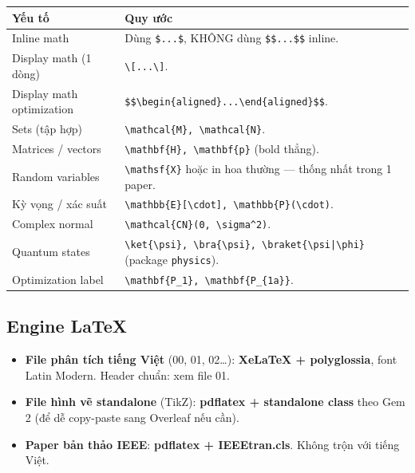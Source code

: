 \documentclass[11pt,a4paper]{article}
\begin{document}
\begin{longtable}{@{}p{5cm} p{10cm}@{}}
\toprule
\textbf{Yếu tố} & \textbf{Quy ước} \\
\midrule
\endhead
Inline math & Dùng \texttt{\$...\$}, KHÔNG dùng \texttt{\$\$...\$\$} inline. \\
Display math (1 dòng) & \texttt{\textbackslash[...\textbackslash]}. \\
Display math optimization & \texttt{\$\$\textbackslash begin\{aligned\}...\textbackslash end\{aligned\}\$\$}. \\
Sets (tập hợp) & \texttt{\textbackslash mathcal\{M\}, \textbackslash mathcal\{N\}}. \\
Matrices / vectors & \texttt{\textbackslash mathbf\{H\}, \textbackslash mathbf\{p\}} (bold thẳng). \\
Random variables & \texttt{\textbackslash mathsf\{X\}} hoặc in hoa thường --- thống nhất trong 1 paper. \\
Kỳ vọng / xác suất & \texttt{\textbackslash mathbb\{E\}[\textbackslash cdot], \textbackslash mathbb\{P\}(\textbackslash cdot)}. \\
Complex normal & \texttt{\textbackslash mathcal\{CN\}(0, \textbackslash sigma\textasciicircum 2)}. \\
Quantum states & \texttt{\textbackslash ket\{\textbackslash psi\}, \textbackslash bra\{\textbackslash psi\}, \textbackslash braket\{\textbackslash psi|\textbackslash phi\}} (package \texttt{physics}). \\
Optimization label & \texttt{\textbackslash mathbf\{P\_1\}, \textbackslash mathbf\{P\_\{1a\}\}}. \\
\bottomrule
\end{longtable}

\subsection{Engine LaTeX}

\begin{itemize}
  \item \textbf{File phân tích tiếng Việt} (00, 01, 02\dots): \textbf{XeLaTeX + polyglossia}, font Latin Modern. Header chuẩn: xem file 01.
  \item \textbf{File hình vẽ standalone} (TikZ): \textbf{pdflatex + standalone class} theo Gem 2 (để dễ copy-paste sang Overleaf nếu cần).
  \item \textbf{Paper bản thảo IEEE}: \textbf{pdflatex + IEEEtran.cls}. Không trộn với tiếng Việt.
\end{itemize}
\end{document}
